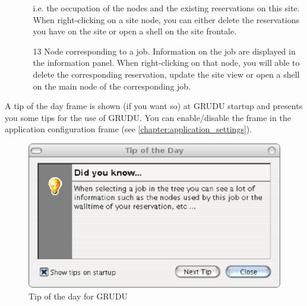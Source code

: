 \begin{itemize}
\begin{itemize}
    i.e. the occupation of the nodes and the existing reservations on this
    site. When right-clicking on a site node, you can either delete the
    reservations you have on the site or open a shell on the site frontale.
    \item[13] Node corresponding to a job. Information on the job are displayed
    in the information panel. When right-clicking on that node, you will able to
    delete the corresponding reservation, update the site view or open a shell on
    the main node of the corresponding job.
  \end{itemize}  
\end{itemize}

A tip of the day frame is shown (if you want so) at GRUDU startup and presents
you some tips for the use of GRUDU. You can enable/disable the frame in the
application configuration frame (see \ref{chapter:application_settings}).

\begin{figure}[H]
\centering
\includegraphics[width=0.6\linewidth]{figures/GRUDU_totd.eps}
\caption{Tip of the day for GRUDU}
\label{fig:GRUDU_totd}
\end{figure}

